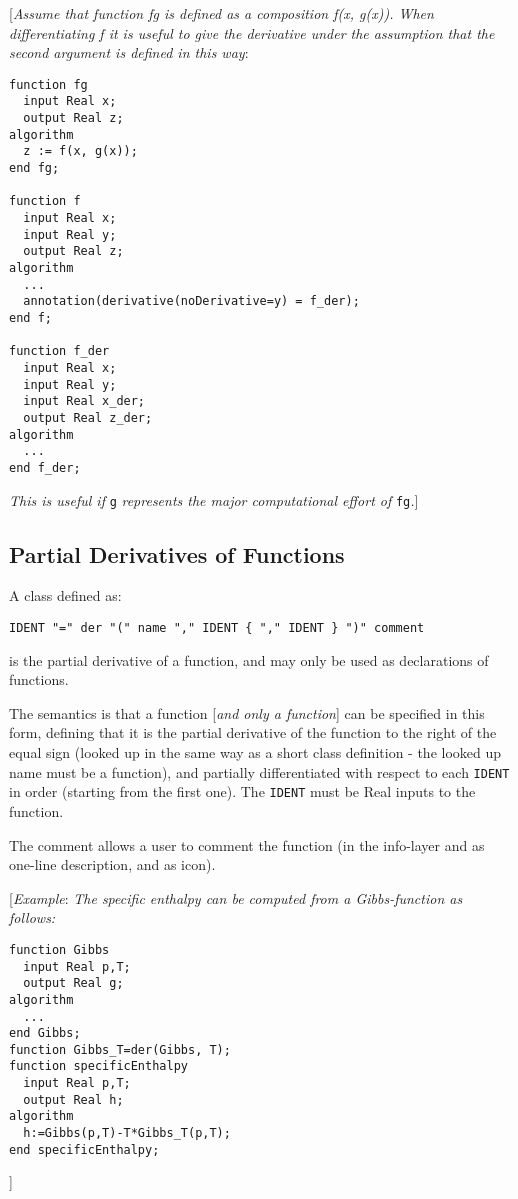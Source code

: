 {[}\emph{Assume that function fg is defined as a composition f(x, g(x)).
When differentiating f it is useful to give the derivative under the
assumption that the second argument is defined in this way}:

\begin{lstlisting}[language=modelica]
function fg
  input Real x;
  output Real z;
algorithm
  z := f(x, g(x));
end fg;

function f
  input Real x;
  input Real y;
  output Real z;
algorithm
  ...
  annotation(derivative(noDerivative=y) = f_der);
end f;

function f_der
  input Real x;
  input Real y;
  input Real x_der;
  output Real z_der;
algorithm
  ...
end f_der;
\end{lstlisting}
\emph{This is useful if} \lstinline!g! \emph{represents the major computational
effort of} \lstinline!fg!\emph{.}{]}

\subsection{Partial Derivatives of Functions}

A class defined as:
\begin{lstlisting}[language=grammar]
IDENT "=" der "(" name "," IDENT { "," IDENT } ")" comment
\end{lstlisting}

is the partial derivative of a function, and may only be used as
declarations of functions.

The semantics is that a function {[}\emph{and only a function}{]} can be
specified in this form, defining that it is the partial derivative of
the function to the right of the equal sign (looked up in the same way
as a short class definition - the looked up name must be a function),
and partially differentiated with respect to each \lstinline!IDENT! in order
(starting from the first one). The \lstinline!IDENT! must be Real inputs to the
function.

The comment allows a user to comment the function (in the info-layer and
as one-line description, and as icon).

{[}\emph{Example}: \emph{The specific enthalpy can be computed from a
Gibbs-function as follows:}

\begin{lstlisting}[language=modelica]
function Gibbs
  input Real p,T;
  output Real g;
algorithm
  ...
end Gibbs;
function Gibbs_T=der(Gibbs, T);
function specificEnthalpy
  input Real p,T;
  output Real h;
algorithm
  h:=Gibbs(p,T)-T*Gibbs_T(p,T);
end specificEnthalpy;
\end{lstlisting}
{]}

